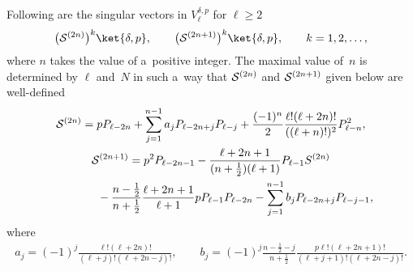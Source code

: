 \documentclass[pdftex]{sigma}
\numberwithin{equation}{section}
\begin{document}
\begin{proposition}
\label{prop3}
Following are the singular vectors in $V^{\delta,p}_{\ell} $ for $ \ell \geq 2$
\begin{gather}
\big({\cal S}^{(2n)}\big)^k \ket{\delta,p},
\qquad
\big({\cal S}^{(2n+1)}\big)^k \ket{\delta,p},
\qquad
k = 1, 2, \dots,
\label{SVformula1}
\end{gather}
where $ n $ takes the value of a~positive integer.
The maximal value of~$n$ is determined by $ \ell $ and~$N$ in such a~way that $ {\cal S}^{(2n)}$ and $ {\cal
S}^{(2n+1)} $ given below are well-defined
\begin{gather}
    {\cal S}^{(2n)} = p P_{\ell-2n} + \sum\limits_{j=1}^{n-1} a_j P_{\ell-2n+j} P_{\ell-j} + \frac{(-1)^n}{2}
\frac{\ell!  (\ell+2n)!}{((\ell+n)!)^2}  P_{\ell-n}^2,
\label{SVformula2}\\
 {\cal S}^{(2n+1)} = p^2 P_{\ell-2n-1} - \frac{\ell+2n+1}{(n+\frac{1}{2}) (\ell+1)} P_{\ell-1} S^{(2n)}  \nonumber
\\
\hphantom{{\cal S}^{(2n+1)}=}{}
- \frac{n-\frac{1}{2}}{n+\frac{1}{2}}  \frac{\ell+2n+1}{\ell+1}  p  P_{\ell-1}  P_{\ell-2n} -
\sum\limits_{j=1}^{n-1} b_j  P_{\ell-2n+j}  P_{\ell-j-1},
\label{SVformula3}
\end{gather}
where
\begin{gather*}
a_j = (-1)^j \frac{\ell!  (\ell+2n)!}{(\ell+j)!  (\ell+2n-j)!},
\qquad
b_j = (-1)^j \frac{n-\frac{1}{2}-j}{n+\frac{1}{2}} \frac{p \ell!  (\ell+2n+1)!}{(\ell+j+1)! (\ell+2n-j)!}.
\end{gather*}
\end{proposition}
\end{document}
